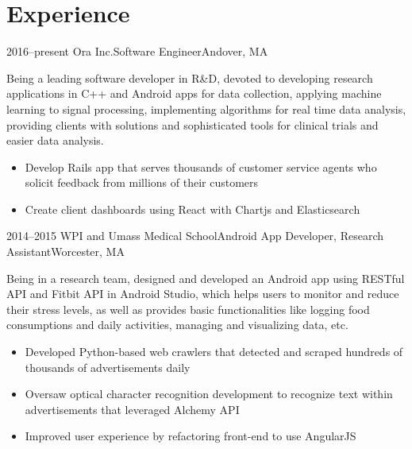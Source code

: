 \documentclass[10pt,a4paper,merriweather]{moderncv}        %
\begin{document}
\makecvtitle
\vspace{-1.5cm}

\section{Experience}

\cventry
{2016--present}
{Ora Inc.}{Software Engineer}{Andover, MA}{}
{Being a leading software developer in R\&D, devoted to developing research applications in C++ and Android apps for data collection, applying machine learning to signal processing, implementing algorithms for real time data analysis, providing clients with solutions and sophisticated tools for clinical trials and easier data analysis.
\begin{itemize}
\item Develop Rails app that serves thousands of customer service agents who solicit feedback from millions of their customers
\item Create client dashboards using React with Chartjs and Elasticsearch
\end{itemize}}
\vspace{.15cm}

\cventry
{2014--2015}
{WPI and Umass Medical School}{Android App Developer, Research Assistant}{Worcester, MA}{}
{Being in a research team, designed and developed an Android app using RESTful API and Fitbit API in Android Studio, which helps users to monitor and reduce their stress levels, as well as provides basic functionalities like logging food consumptions and daily activities, managing and visualizing data, etc. 
\begin{itemize}
\item Developed Python-based web crawlers that detected and scraped hundreds of thousands of advertisements daily
\item Oversaw optical character recognition development to recognize text within advertisements that leveraged Alchemy API
\item Improved user experience by refactoring front-end to use AngularJS
\end{itemize}}
\vspace{.15cm}

\end{document}
